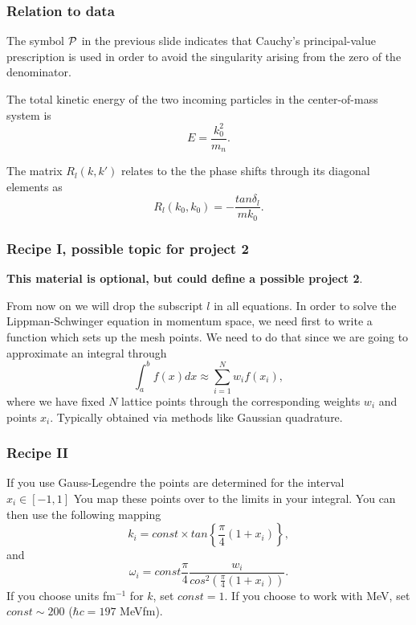 \documentclass[compress]{beamer}
\begin{document}
\frame
{
\frametitle{Relation to data}
\begin{small}
{\scriptsize

The symbol ${\cal P}$ in the previous slide indicates that Cauchy's principal-value prescription
is used in order to avoid the singularity arising from the zero of the denominator.


The total kinetic energy of the two 
incoming particles in the center-of-mass system
is 
\[
    E=\frac{k_0^2}{m_n}.
\]


The matrix $R_l(k,k')$ relates to the 
the  phase shifts through its diagonal elements as
\[
     R_l(k_0,k_0)=-\frac{tan\delta_l}{mk_0}.
     \label{eq:shifts}
\]
}
\end{small}

}

\frame
{
\frametitle{Recipe I, possible topic for project 2}
\begin{small}
{\scriptsize
{\bf This material is optional, but could define a possible project 2}.

From now on we will drop the subscript $l$ in all equations.
In order to solve the Lippman-Schwinger equation 
in momentum space, we need first to write 
a function which sets up the mesh points. 
We need to do that since we are going to approximate an integral
through 
\[
   \int_a^bf(x)dx\approx\sum_{i=1}^Nw_if(x_i),
\]
where we have fixed $N$ lattice points through the corresponding weights
$w_i$ and points $x_i$. Typically obtained via methods like Gaussian quadrature.
}
\end{small}

}


\frame
{
\frametitle{Recipe II}
\begin{small}
{\scriptsize

If you use Gauss-Legendre the points are determined for the interval $x_i\in [-1,1]$
You map these points over to the limits in your integral. You can then
use the following mapping
        \[
          k_i=const\times tan\left\{\frac{\pi}{4}(1+x_i)\right\},
        \]
and 
         \[
            \omega_i= const\frac{\pi}{4}\frac{w_i}{cos^2\left(\frac{\pi}{4}(1+x_i)\right)}.
         \]
If you choose units fm$^{-1}$ for $k$, set $const=1$. If you choose to work
with MeV, set $const\sim 200$ ($\hbar c=197$ MeVfm).
}
\end{small}

}
\end{document}
